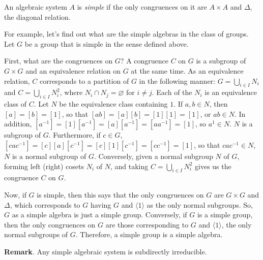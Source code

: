 \documentclass[12pt]{article}
\begin{document}
An algebraic system $A$ is \emph{simple} if the only congruences on it are $A\times A$ and $\Delta$, the diagonal relation.

For example, let's find out what are the simple algebras in the class of groups.  Let $G$ be a group that is simple in the sense defined above.  

First, what are the congruences on $G$?  A congruence $C$ on $G$ is a subgroup of $G\times G$ and an equivalence relation on $G$ at the same time.  As an equivalence relation, $C$ corresponds to a partition of $G$ in the following manner: $G=\bigcup_{i\in I} N_i$ and $C=\bigcup_{i\in I} N_i^2$, where $N_i\cap N_j=\varnothing$ for $i\ne j$.  Each of the $N_i$ is an equivalence class of $C$.  Let $N$ be the equivalence class containing $1$.  If $a,b\in N$, then $[a]=[b]=[1]$, so that $[ab]=[a][b]=[1][1]=[1]$, or $ab\in N$.  In addition, $[a^{-1}]=[1][a^{-1}]=[a][a^{-1}]=[aa^{-1}]=[1]$, so $a^{1}\in N$.  $N$ is a subgroup of $G$.  Furthermore, if $c\in G$, $[cac^{-1}]=[c][a][c^{-1}]= [c][1][c^{-1}]= [cc^{-1}]=[1]$, so that $cac^{-1}\in N$, $N$ is a normal subgroup of $G$.  Conversely, given a normal subgroup $N$ of $G$, forming left (right) cosets $N_i$ of $N$, and taking $C=\bigcup_{i\in I} N_i^2$ gives us the congruence $C$ on $G$.

Now, if $G$ is simple, then this says that the only congruences on $G$ are $G\times G$ and $\Delta$, which corresponds to $G$ having $G$ and $\langle 1\rangle$ as the only normal subgroups.  So, $G$ as a simple algebra is just a simple group.  Conversely, if $G$ is a simple group, then the only congruences on $G$ are those corresponding to $G$ and $\langle 1\rangle$, the only normal subgroups of $G$.  Therefore, a simple group is a simple algebra.

\textbf{Remark}.  Any simple algebraic system is subdirectly irreducible.
\end{document}
